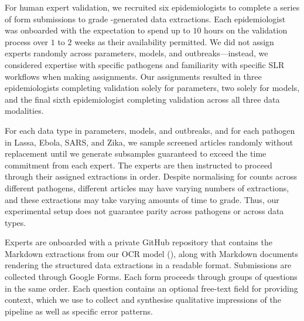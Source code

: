 For human expert validation, we recruited six epidemiologists to complete a series of form submissions to grade \name{}-generated data extractions. Each epidemiologist was onboarded with the expectation to spend up to $10$ hours on the validation process over $1$ to $2$ weeks as their availability permitted. We did not assign experts randomly across parameters, models, and outbreaks—instead, we considered expertise with specific pathogens and familiarity with specific SLR workflows when making assignments. Our assignments resulted in three epidemiologists completing validation solely for parameters, two solely for models, and the final sixth epidemiologist completing validation across all three data modalities.

For each data type in parameters, models, and outbreaks, and for each pathogen in Lassa, Ebola, SARS, and Zika, we sample screened articles randomly without replacement until we generate subsamples guaranteed to exceed the time commitment from each expert. The experts are then instructed to proceed through their assigned extractions in order. Despite normalising for counts across different pathogens, different articles may have varying numbers of extractions, and these extractions may take varying amounts of time to grade. Thus, our experimental setup does not guarantee parity across pathogens or across data types.

Experts are onboarded with a private GitHub repository that contains the Markdown extractions from our OCR model (), along with Markdown documents rendering the structured data extractions in a readable format. Submissions are collected through Google Forms. Each form proceeds through groups of questions in the same order. Each question contains an optional free-text field for providing context, which we use to collect and synthesise qualitative impressions of the pipeline as well as specific error patterns.

